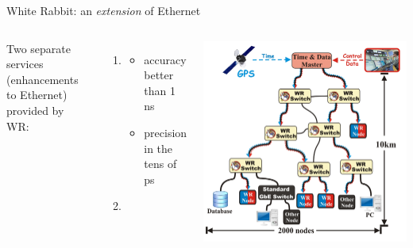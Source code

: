 \documentclass[compress, red]{beamer}
\begin{document}
\begin{frame}{White Rabbit: an \emph{extension} of Ethernet}


\begin{columns}[c]
 
  Two separate services (enhancements to Ethernet) provided by WR:
\begin{enumerate}
\item \color{blue!90}{Synchronization:}
  \begin{itemize}
    \item accuracy\\ better than 1 ns
    \item precision in the tens of ps
\end{itemize}
\item \color{red}{Deterministic, reliable and low-latency Control Data delivery}
\end{enumerate}

    \begin{center}
    \includegraphics[width=1.0\textwidth]{network/wr_network-enhanced_pro.pdf}
    \end{center}
\end{columns}

\end{frame}
\end{document}
